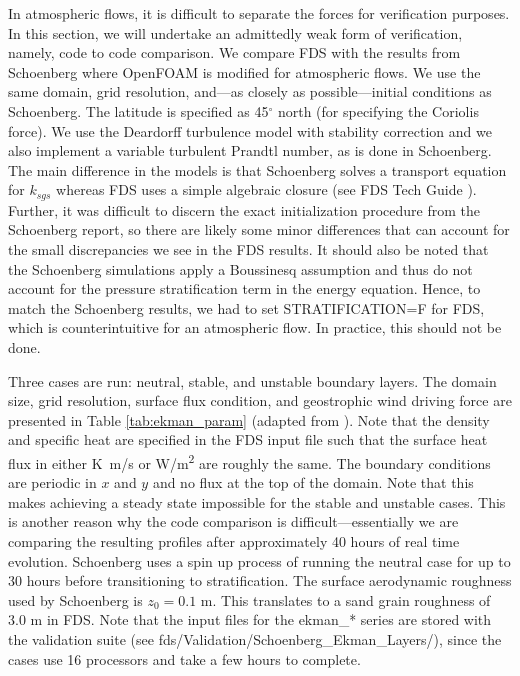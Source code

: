 \documentclass[11pt]{book}
\begin{document}
In atmospheric flows, it is difficult to separate the forces for verification purposes.  In this section, we will undertake an admittedly weak form of verification, namely, code to code comparison.  We compare FDS with the results from Schoenberg \cite{Schoenberg:2004} where OpenFOAM is modified for atmospheric flows.  We use the same domain, grid resolution, and---as closely as possible---initial conditions as Schoenberg.  The latitude is specified as 45$^\circ$ north (for specifying the Coriolis force).  We use the Deardorff turbulence model with stability correction and we also implement a variable turbulent Prandtl number, as is done in Schoenberg.  The main difference in the models is that Schoenberg solves a transport equation for $k_{sgs}$ whereas FDS uses a simple algebraic closure (see FDS Tech Guide \cite{FDS_Math_Guide}).  Further, it was difficult to discern the exact initialization procedure from the Schoenberg report, so there are likely some minor differences that can account for the small discrepancies we see in the FDS results.  It should also be noted that the Schoenberg simulations apply a Boussinesq assumption and thus do not account for the pressure stratification term in the energy equation.  Hence, to match the Schoenberg results, we had to set {\ct STRATIFICATION=F} for FDS, which is counterintuitive for an atmospheric flow.  In practice, this should not be done.

Three cases are run: neutral, stable, and unstable boundary layers.  The domain size, grid resolution, surface flux condition, and geostrophic wind driving force are presented in Table \ref{tab:ekman_param} (adapted from \cite{Schoenberg:2004}). Note that the density and specific heat are specified in the FDS input file such that the surface heat flux in either \si{K.m/s} or \si{W/m^2} are roughly the same.  The boundary conditions are periodic in $x$ and $y$ and no flux at the top of the domain.  Note that this makes achieving a steady state impossible for the stable and unstable cases.  This is another reason why the code comparison is difficult---essentially we are comparing the resulting profiles after approximately 40 hours of real time evolution.  Schoenberg uses a spin up process of running the neutral case for up to 30 hours before transitioning to stratification.  The surface aerodynamic roughness used by Schoenberg is $z_0 = 0.1$ m.  This translates to a sand grain roughness of 3.0 m in FDS.  Note that the input files for the {\ct ekman\_*} series are stored with the validation suite (see {\ct fds/Validation/Schoenberg\_Ekman\_Layers/}), since the cases use 16 processors and take a few hours to complete.
\end{document}

